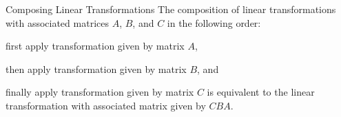 \documentclass[xcolor=dvipsnames,aspectratio=169,t]{beamer}
\begin{document}
\begin{frame}{Composing Linear Transformations}
  \bbox
  The composition of linear transformations with associated matrices $A$, $B$, and $C$ in the following order:
  \bb
  \item first apply transformation given by matrix $A$,
  \item then apply transformation given by matrix $B$, and 
  \item finally apply transformation given by matrix $C$
  \ee
  is equivalent to the linear transformation with associated matrix given by %
  $CBA$. 
  \ebox


\end{frame}
\end{document}
